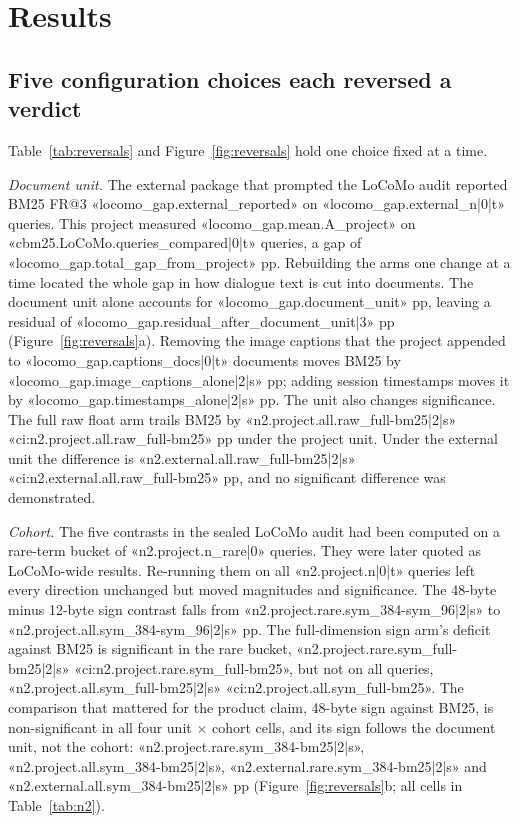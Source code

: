 \documentclass[11pt,a4paper]{article}
\makeatletter
\newcommand{\FR}{FR@3}
\makeatother
\begin{document}
\section{Results}\label{sec:results}
\subsection{Five configuration choices each reversed a verdict}\label{sec:reversals}
Table~\ref{tab:reversals} and Figure~\ref{fig:reversals} hold one choice fixed at a time.

\emph{Document unit.} The external package that prompted the LoCoMo audit reported BM25 \FR{} «locomo_gap.external_reported» on «locomo_gap.external_n|0|t» queries. This project measured «locomo_gap.mean.A_project» on «cbm25.LoCoMo.queries_compared|0|t» queries, a gap of «locomo_gap.total_gap_from_project» pp. Rebuilding the arms one change at a time located the whole gap in how dialogue text is cut into documents. The document unit alone accounts for «locomo_gap.document_unit» pp, leaving a residual of «locomo_gap.residual_after_document_unit|3» pp (Figure~\ref{fig:reversals}a). Removing the image captions that the project appended to «locomo_gap.captions_docs|0|t» documents moves BM25 by «locomo_gap.image_captions_alone|2|s» pp; adding session timestamps moves it by «locomo_gap.timestamps_alone|2|s» pp. The unit also changes significance. The full raw float arm trails BM25 by «n2.project.all.raw_full-bm25|2|s» «ci:n2.project.all.raw_full-bm25» pp under the project unit. Under the external unit the difference is «n2.external.all.raw_full-bm25|2|s» «ci:n2.external.all.raw_full-bm25» pp, and no significant difference was demonstrated.

\emph{Cohort.} The five contrasts in the sealed LoCoMo audit had been computed on a rare-term bucket of «n2.project.n_rare|0» queries. They were later quoted as LoCoMo-wide results. Re-running them on all «n2.project.n|0|t» queries left every direction unchanged but moved magnitudes and significance. The 48-byte minus 12-byte sign contrast falls from «n2.project.rare.sym_384-sym_96|2|s» to «n2.project.all.sym_384-sym_96|2|s» pp. The full-dimension sign arm's deficit against BM25 is significant in the rare bucket, «n2.project.rare.sym_full-bm25|2|s» «ci:n2.project.rare.sym_full-bm25», but not on all queries, «n2.project.all.sym_full-bm25|2|s» «ci:n2.project.all.sym_full-bm25». The comparison that mattered for the product claim, 48-byte sign against BM25, is non-significant in all four unit $\times$ cohort cells, and its sign follows the document unit, not the cohort: «n2.project.rare.sym_384-bm25|2|s», «n2.project.all.sym_384-bm25|2|s», «n2.external.rare.sym_384-bm25|2|s» and «n2.external.all.sym_384-bm25|2|s» pp (Figure~\ref{fig:reversals}b; all cells in Table~\ref{tab:n2}).
\end{document}
